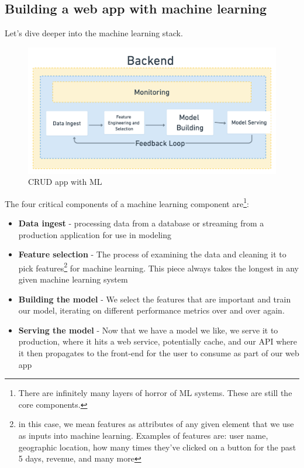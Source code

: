 \documentclass[draft, 11pt]{diazessay} %
\begin{document}
\subsection{Building a web app with machine learning}
Let's dive deeper into the machine learning stack. 

\begin{figure}[!ht]
\centering
\includegraphics[width=.75\textwidth]{figures/ml_system.png}
\caption{CRUD app with ML}
\end{figure}

The four critical components of a machine learning component are\footnote{There are infinitely many layers of horror of ML systems\citep{kreuzberger2022machine}. These are still the core components. }:

\begin{itemize}
  \item \textbf{Data ingest} - processing data from a database or streaming from a production application for use in modeling
  \item \textbf{Feature selection} - The process of examining the data and cleaning it to pick features\footnote{in this case, we mean features as attributes of any given element that we use as inputs into machine learning. Examples of features are: user name, geographic location, how many times they've clicked on a button for the past 5 days, revenue, and many more} for machine learning. This piece always takes the longest in any given machine learning system
  \item \textbf{Building the model} - We select the features that are important and train our model, iterating on different performance metrics over and over again.
  \item \textbf{Serving the model} - Now that we have a model we like, we serve it to production, where it hits a web service, potentially cache, and our API where it then propagates to the front-end for the user to consume as part of our web app
\end{itemize}
\end{document}
